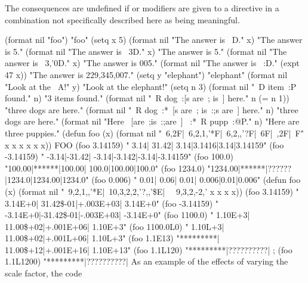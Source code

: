
The consequences are undefined if  or  modifiers
are given to a directive in a combination not specifically described
here as being meaningful.

\endsubsubsection%

\endsubsection%


\code
 (format nil "foo") \EV "foo"
 (setq x 5) 
 (format nil "The answer is ~D." x) \EV "The answer is 5."
 (format nil "The answer is ~3D." x) \EV "The answer is   5."
 (format nil "The answer is ~3,'0D." x) \EV "The answer is 005."
 (format nil "The answer is ~:D." (expt 47 x))
\EV "The answer is 229,345,007."
 (setq y "elephant") \EV "elephant"
 (format nil "Look at the ~A!" y) \EV "Look at the elephant!"
 (setq n 3) 
 (format nil "~D item~:P found." n) \EV "3 items found."
 (format nil "~R dog~:[s are~; is~] here." n (= n 1))
\EV "three dogs are here."
 (format nil "~R dog~:*~[s are~; is~:;s are~] here." n)
\EV "three dogs are here."
 (format nil "Here ~[are~;is~:;are~] ~:*~R pupp~:@P." n)
\EV "Here are three puppies."
\endcode
\code
 (defun foo (x)
   (format nil "~6,2F|~6,2,1,'*F|~6,2,,'?F|~6F|~,2F|~F"
           x x x x x x)) \EV FOO
 (foo 3.14159)  \EV "  3.14| 31.42|  3.14|3.1416|3.14|3.14159"
 (foo -3.14159) \EV " -3.14|-31.42| -3.14|-3.142|-3.14|-3.14159"
 (foo 100.0)    \EV "100.00|******|100.00| 100.0|100.00|100.0"
 (foo 1234.0)   \EV "1234.00|******|??????|1234.0|1234.00|1234.0"
 (foo 0.006)    \EV "  0.01|  0.06|  0.01| 0.006|0.01|0.006"
\endcode
\code
 (defun foo (x)  
    (format nil
           "~9,2,1,,'*E|~10,3,2,2,'?,,'\$E|~
            ~9,3,2,-2,'%
           x x x x))
 (foo 3.14159)  \EV "  3.14E+0| 31.42\$-01|+.003E+03|  3.14E+0"
 (foo -3.14159) \EV " -3.14E+0|-31.42\$-01|-.003E+03| -3.14E+0"
 (foo 1100.0)   \EV "  1.10E+3| 11.00\$+02|+.001E+06|  1.10E+3"
 (foo 1100.0L0) \EV "  1.10L+3| 11.00\$+02|+.001L+06|  1.10L+3"
 (foo 1.1E13)   \EV "*********| 11.00\$+12|+.001E+16| 1.10E+13"
 (foo 1.1L120)  \EV "*********|??????????|%
 ; (foo 1.1L1200) \EV "*********|??????????|%
\endcode
As an example of the effects of varying the scale factor, the code

